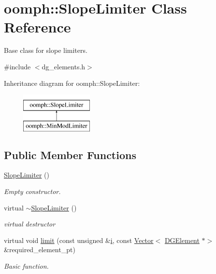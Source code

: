 \hypertarget{classoomph_1_1SlopeLimiter}{}\section{oomph\+:\+:Slope\+Limiter Class Reference}
\label{classoomph_1_1SlopeLimiter}


Base class for slope limiters.  




{\ttfamily \#include $<$dg\+\_\+elements.\+h$>$}

Inheritance diagram for oomph\+:\+:Slope\+Limiter\+:\begin{figure}[H]
\begin{center}
\leavevmode
\includegraphics[height=2.000000cm]{classoomph_1_1SlopeLimiter}
\end{center}
\end{figure}
\subsection*{Public Member Functions}
\begin{DoxyCompactItemize}
\item 
\hyperlink{classoomph_1_1SlopeLimiter_a9ea7a03f4b5992b7c4a3d324c01fa257}{Slope\+Limiter} ()
\begin{DoxyCompactList}\small\item\em Empty constructor. \end{DoxyCompactList}\item 
virtual \hyperlink{classoomph_1_1SlopeLimiter_a40f42cee7a9bdfa71f200d230dc66008}{$\sim$\+Slope\+Limiter} ()
\begin{DoxyCompactList}\small\item\em virtual destructor \end{DoxyCompactList}\item 
virtual void \hyperlink{classoomph_1_1SlopeLimiter_a8b836449e68921bade7cd580fa2f6ba7}{limit} (const unsigned \&\hyperlink{cfortran_8h_adb50e893b86b3e55e751a42eab3cba82}{i}, const \hyperlink{classoomph_1_1Vector}{Vector}$<$ \hyperlink{classoomph_1_1DGElement}{D\+G\+Element} $\ast$$>$ \&required\+\_\+element\+\_\+pt)
\begin{DoxyCompactList}\small\item\em Basic function. \end{DoxyCompactList}\end{DoxyCompactItemize}


